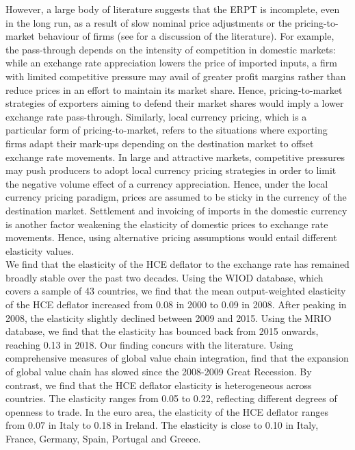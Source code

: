 \documentclass[12pt,a4paper]{article}
\begin{document}
However, a large body of literature suggests that the ERPT is incomplete, even in the long run, as a result of slow nominal price adjustments or the pricing-to-market behaviour of firms (see \cite{Ozyurt2016} for a discussion of the literature).
For example, the pass-through depends on the intensity of competition in domestic markets: while an exchange rate appreciation lowers the price of imported inputs, a ﬁrm with limited competitive pressure may avail of greater proﬁt margins rather than reduce prices in an eﬀort to maintain its market share.
Hence, pricing-to-market strategies of exporters aiming to defend their market shares would imply a lower exchange rate pass-through.
Similarly, local currency pricing, which is a particular form of pricing-to-market, refers to the situations where exporting firms adapt their mark-ups depending on the destination market to offset exchange rate movements. 
In large and attractive markets, competitive pressures may push producers to adopt local currency pricing strategies in order to limit the negative volume effect of a currency appreciation. 
Hence, under the local currency pricing paradigm, prices are assumed to be sticky in the currency of the destination
market.
Settlement and invoicing of imports in the domestic currency is another factor weakening the elasticity of domestic prices to exchange rate movements.
Hence, using alternative pricing assumptions would entail different elasticity values. \\
We find that the elasticity of the HCE deflator to the exchange rate has remained broadly stable over the past two decades. 
Using the WIOD database, which covers a sample of 43 countries, we find that the mean output-weighted elasticity of the HCE deflator increased from 0.08 in 2000 to 0.09 in 2008. 
After peaking in 2008, the elasticity slightly declined between 2009 and 2015. 
Using the MRIO database, we find that the elasticity has bounced back from 2015 onwards, reaching 0.13 in 2018.
Our finding concurs with the literature.
Using comprehensive measures of global value chain integration, \cite{Timmer2016} find that the expansion of global value chain has slowed since the 2008-2009 Great Recession.
By contrast, we find that the HCE deflator elasticity is heterogeneous across countries. 
The elasticity ranges from 0.05 to 0.22, reflecting different degrees of openness to trade. 
In the euro area, the elasticity of the HCE deflator ranges from 0.07 in Italy to 0.18 in Ireland. %
The elasticity is close to 0.10 in Italy, France, Germany, Spain, Portugal and Greece. 
\end{document}
